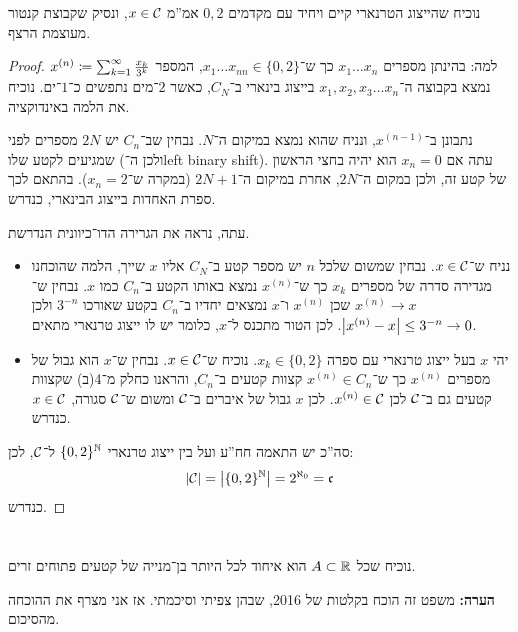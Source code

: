 \documentclass[]{../../../../tex/classes/homework}
\begin{document}
	\section{}
	נוכיח שהייצוג הטרנארי קיים ויחיד עם מקדמים $0, 2$ אמ''מ $x \in \mathcal{C}$, ונסיק שקבוצת קנטור מעוצמת הרצף. 
	\begin{proof}
		למה: בהינתן מספרים $x_1 \dots x_n$ כך ש־$x_1 \dots x_{n n} \in \{0, 2\}$, המספר $x^{(n)} \coloneqq \sum_{k = 1}^{\infty}\frac{x_k}{3^{k}}$ נמצא בקבוצה ה־$x_1,x_2,x_3 \dots x_n$ בייצוג בינארי ב־$C_N$, כאשר $2$־מים נתפשים כ־$1$־ים. נוכיח את הלמה באינדוקציה. 
		
		נתבונן ב־$x^{(n -1)}$, ונניח שהוא נמצא במיקום ה־$N$. נבחין שב־$C_n$ יש $2N$ מספרים לפני שמגיעים לקטע שלו (ולכן ה־left binary shift). עתה אם $x_n = 0$ הוא יהיה בחצי הראשון של קטע זה, ולכן במקום ה־$2N$, אחרת במיקום ה־$2N + 1$ (במקרה ש־$x_n = 2$). בהתאם לכך ספרת האחדות בייצוג הבינארי, כנדרש. 
		
		עתה, נראה את הגרירה הדו־כיוונית הנדרשת. 
		\begin{itemize}
			\item[$\implies$]נניח ש־$x \in \mathcal{C}$. נבחין שמשום שלכל $n$ יש מספר קטע ב־$C_N$ אליו $x$ שייך, הלמה שהוכחנו מגדירה סדרה של מספרים $x_k$ כך ש־$x^{(n)}$ נמצא באותו הקטע ב־$C_n$ כמו $x$. נבחין ש־$x^{(n)} \to x$ שכן $x^{(n)}$ ו־$x$ נמצאים יחדיו ב־$C_n$ בקטע שאורכו $3^{-n}$ ולכן $\left \lvert x^{(n)} - x \right \rvert \le 3^{-n} \to 0$. לכן הטור מתכנס ל־$x$, כלומר יש לו ייצוג טרנארי מתאים. 
			\item[$\impliedby$]יהי $x$ בעל ייצוג טרנארי עם ספרה $x_k \in \{0, 2\}$. נוכיח ש־$x \in \mathcal{C}$. נבחין ש־$x$ הוא גבול של מספרים $x^{(n)}$ כך ש־$x^{(n)} \in C_n$ קצוות קטעים ב־$C_n$, והראנו כחלק מ־4(ב) שקצוות קטעים גם ב־$\mathcal{C}$ לכן $x^{(n)} \in \mathcal{C}$. לכן $x$ גבול של איברים ב־$\mathcal{C}$ ומשום ש־$\mathcal{C}$ סגורה, $x \in \mathcal{C}$ כנדרש. 
		\end{itemize}
		
		סה''כ יש התאמה חח''ע ועל בין ייצוג טרנארי $\{0, 2\}^{\mathbb{N}}$ ל־$\mathcal{C}$, לכן: 
		\[ \left \lvert \mathcal{C} \right \rvert = \left \lvert \{0, 2\}^{\mathbb{N}} \right \rvert = 2^{\aleph_0} = \mathfrak{c} \]
		כנדרש. 
	\end{proof}
	
	\section{}
	נוכיח שכל $A \subset \mathbb{R}$ הוא איחוד לכל היותר בן־מנייה של קטעים פתוחים זרים. 
	
	\textbf{הערה: }משפט זה הוכח בקלטות של 2016, שבהן צפיתי וסיכמתי. אז אני מצרף את ההוכחה מהסיכום. 
	
\end{document}

